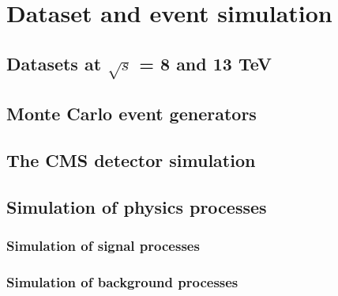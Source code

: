 \chapter{Dataset and event simulation}
\label{ch:dataAndSim}

\section{Datasets at $\sqrt{s}$ = 8 and 13 TeV}
\section{Monte Carlo event generators}
\section{The CMS detector simulation}
\section{Simulation of physics processes}
\subsection{Simulation of signal processes}
\subsection{Simulation of background processes}